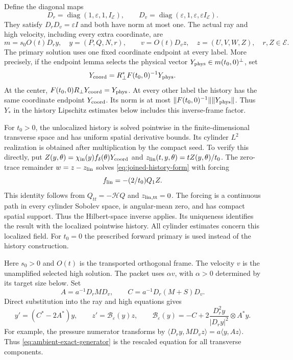 \documentclass[11pt]{article}
\theoremstyle{definition}
\begin{document}
Define the diagonal maps
\[
 D_r=\operatorname{diag}(1,\varepsilon,1,I_{\mathcal E}),\qquad
 D_v=\operatorname{diag}(\varepsilon,1,\varepsilon,
                                      \varepsilon I_{\mathcal E}).
\]
They satisfy $D_rD_v=\varepsilon I$ and both have norm at most one.
The actual ray and high velocity, including every extra coordinate, are
\begin{equation}\label{eq:ambient-scaled-states}
 m=s_0 O(t)D_r y,\quad y=(P,Q,N,r),\qquad
 v=O(t)D_v z,\quad z=(U,V,W,Z),\quad r,Z\in\mathcal E.
\end{equation}
The primary solution uses one fixed coordinate endpoint at every label.
More precisely, if the endpoint lemma selects the physical vector
$Y_{\rm phys}\in m(t_0,0)^\perp$, set
\[
 Y_{\rm coord}=R_\perp^*F(t_0,0)^{-1}Y_{\rm phys}.
\]
At the center, $F(t_0,0)R_\perp Y_{\rm coord}=Y_{\rm phys}$.
At every other label the history has the same coordinate endpoint
$Y_{\rm coord}$. Its norm is at most
$\|F(t_0,0)^{-1}\|\|Y_{\rm phys}\|$. Thus $Y_*$ in the history
Lipschitz estimates below includes this inverse-frame factor.

For $t_0>0$, the unlocalized history is solved pointwise in the finite-dimensional
transverse space and has uniform spatial derivative bounds. Its
cylinder $L^2$ realization is obtained after multiplication by the
compact seed. To verify this directly, put
$Z(y,\theta)=\chi_{\rm in}(y)f_\delta(\theta)Y_{\rm coord}$
and $z_{\rm lin}(t,y,\theta)=tZ(y,\theta)/t_0$.
The zero-trace remainder $w=z-z_{\rm lin}$ solves
\eqref{eq:joined-history-form} with forcing
\[
 f_{\rm lin}=-(2/t_0)Q_1Z.
\]
This identity follows from $Q_{tt}=-\mathcal HQ$ and
$z_{\rm lin,tt}=0$. The forcing is a continuous path in every
cylinder Sobolev space, is angular-mean zero, and has compact spatial
support. Thus the Hilbert-space inverse applies. Its uniqueness
identifies the result with the localized pointwise history. All
cylinder estimates concern this localized field. For $t_0=0$ the
prescribed forward primary is used instead of the history construction.

Here $s_0>0$ and $O(t)$ is the transported orthogonal frame.
The velocity $v$ is the unamplified selected high solution. The packet
uses $\alpha v$, with $\alpha>0$ determined by its target size below.
Set
\[
 A=a^{-1}D_rMD_v,\qquad C=a^{-1}D_r(M+S)D_v .
\]
Direct substitution into the ray and high equations gives
\begin{equation}\label{eq:ambient-exact-generator}
 y'=(C^*-2A^*)y,\qquad
 z'=\mathscr B_\varepsilon(y)z,\qquad
 \mathscr B_\varepsilon(y)
  =-C+2\frac{D_r^2y}{|D_ry|^2}\otimes A^*y .
\end{equation}
For example, the pressure numerator transforms by
$\langle D_ry,MD_vz\rangle=a\langle y,Az\rangle$.
Thus \eqref{eq:ambient-exact-generator} is the rescaled equation
for all transverse components.
\end{document}
